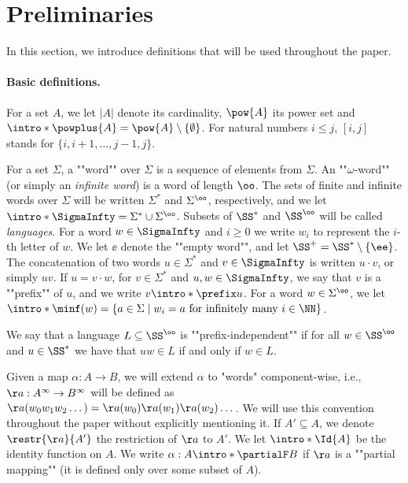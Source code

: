 \documentclass{theoretics}
\begin{document}
 	
	
	\section{Preliminaries}\label{section:preliminaries}
	In this section, we introduce definitions that will be used throughout the paper.


\paragraph*{Basic definitions.}
\AP For a set $A$, we let $|A|$ denote its cardinality, $\pow{A}$ its power set and $\intro*\powplus{A} = \pow{A} \setminus \{\emptyset\}$.
For natural numbers $i\leq j$, $[i,j]$ stands for $\{i,i+1, \dots, j-1,j \}$.

\AP For a set $\Sigma$, a ""word"" over $\Sigma$ is a sequence of elements from $\Sigma$. 
An ""$\omega$-word"" (or simply an \emph{infinite word}) is a word of length $\oo$.
\AP The sets of finite and infinite words over $\Sigma$ will be written $\Sigma^*$ and $\Sigma^{\oo}$, respectively, 
\AP and we let $\intro*\SigmaInfty = \Sigma^* \cup \Sigma^\oo$. Subsets of $\SS^*$ and $\SS^\oo$ will be called \emph{languages}.  For a word $w\in \SigmaInfty$ and $i\geq 0$ we write $w_i$ to represent the $i$-th letter of $w$.
We let $\ee$ denote the ""empty word"", and let $\SS^+ = \SS^*\setminus\{\ee\}$. The concatenation of two words $u\in \Sigma^*$ and $v\in \SigmaInfty$ is written $u\cdot v$, or simply $uv$. \AP If $u=v\cdot w$, for $v\in \Sigma^*$ and $u,w\in \SigmaInfty$, we say that $v$ is a  ""prefix"" of $u$, and we write $v \intro*\prefix u$. %
\AP For a word $w\in \Sigma^\oo$, we let $\intro*\minf(w)=\{ a\in \Sigma \mid w_i=a \text{ for infinitely many } i\in \NN\}$.

\AP We say that a language $L\subseteq \SS^\oo$ is ""prefix-independent"" if for all $w\in \SS^\oo$ and $u\in \SS^*$ we have that  $uw\in L$ if and only if $w\in L$.

Given a map $\alpha:A \rightarrow B$, we will extend $\alpha$ to "words" component-wise, i.e., $\aa: A^\infty \rightarrow B^\infty$ will be defined as $\aa(w_0w_1w_2\dots)=\aa(w_0)\aa(w_1)\aa(w_2)\dots$. We will use this convention throughout the paper without explicitly mentioning it. 
If $A'\subseteq A$, we denote $\restr{\aa}{A'}$ the restriction of $\aa$ to $A'$.
\AP We let $\intro*\Id{A}$ be the identity function on $A$.
\AP We write $\alpha:A \intro*\partialF B$ if $\aa$ is a ""partial mapping"" (it is defined only over some subset of $A$).
\end{document}
